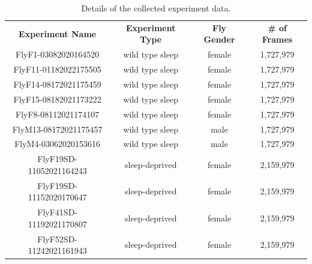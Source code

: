 \begin{table}[htb!]
	\begin{adjustbox}{width=1\textwidth}
		\begin{tabular}{c c c c}
			\toprule
			\multicolumn{1}{c}{\textbf{Experiment Name}} & \multicolumn{1}{c}{\textbf{Experiment Type}} & \multicolumn{1}{c}{\textbf{Fly Gender}} & \multicolumn{1}{c}{\textbf{\# of Frames}} \\
			\cmidrule(lr){1-1}\cmidrule(lr){2-2}\cmidrule(lr){3-3}\cmidrule(lr){4-4}
			FlyF1-03082020164520                         & wild type sleep                              & female                                  & 1,727,979                                 \\
			FlyF11-01182022175505                        & wild type sleep                              & female                                  & 1,727,979                                 \\
			FlyF14-08172021175459                        & wild type sleep                              & female                                  & 1,727,979                                 \\
			FlyF15-08182021173222                        & wild type sleep                              & female                                  & 1,727,979                                 \\
			FlyF8-08112021174107                         & wild type sleep                              & female                                  & 1,727,979                                 \\
			FlyM13-08172021175457                        & wild type sleep                              & male                                    & 1,727,979                                 \\
			FlyM4-03062020153616                         & wild type sleep                              & male                                    & 1,727,979                                 \\
			FlyF19SD-11052021164243                      & sleep-deprived                               & female                                  & 2,159,979                                 \\
			FlyF19SD-11152020170647                      & sleep-deprived                               & female                                  & 2,159,979                                 \\
			FlyF41SD-11192021170807                      & sleep-deprived                               & female                                  & 2,159,979                                 \\
			FlyF52SD-11242021161943                      & sleep-deprived                               & female                                  & 2,159,979                                 \\
			\bottomrule
		\end{tabular}
	\end{adjustbox}
	\caption{Details of the collected experiment data. \label{table:experiment-details}}
\end{table}

